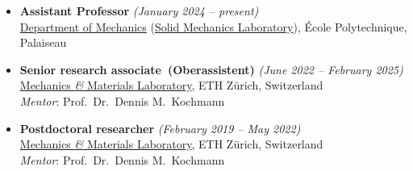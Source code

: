 \documentclass[a4paper,10pt, oneside]{article}
\begin{document}
	\begin{itemize}[wide, labelwidth=!, labelindent=-1em]
		\item[]\textbf{Assistant Professor} \hfill \textit{(January 2024 -- present)} \\
		\href{}{Department of Mechanics} (\href{https://portail.polytechnique.edu/lms/fr/accueil}{Solid Mechanics Laboratory}), {\'E}cole Polytechnique, Palaiseau

		\vspace*{0.5em}
		\item[]\textbf{Senior research associate~(Oberassistent)} \hfill \textit{(June 2022 -- February 2025)} \\
		\href{https://mm.ethz.ch/}{Mechanics \emph{\&} Materials Laboratory}, ETH Z\"{u}rich, Switzerland \\
		\textit{Mentor}: Prof.~Dr.~Dennis M.~Kochmann

		\vspace*{0.5em}
		\item[]\textbf{Postdoctoral researcher} \hfill \textit{(February 2019 -- May 2022)} \\
		\href{https://mm.ethz.ch/}{Mechanics \emph{\&} Materials Laboratory}, ETH Z\"{u}rich, Switzerland \\
		\textit{Mentor}: Prof.~Dr.~Dennis M.~Kochmann

\end{itemize}
\end{document}
